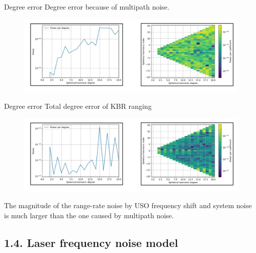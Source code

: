 \documentclass[12pt,english,ignorenonframetext,]{beamer}
\begin{document}
\begin{frame}{Degree error}
	Degree error because of multipath noise.
	\begin{figure}
		\includegraphics{..//images//kbr_multipath.jpg}
	\end{figure}
\end{frame}

\begin{frame}{Degree error}
	Total degree error of KBR ranging
	
	\begin{figure}
		\includegraphics{..//images//kbr.jpg}
	\end{figure}

	The magnitude of the range-rate noise by USO frequency shift and system noise is much larger than the one caused by multipath noise.
\end{frame}

\subsection{\hfill{}1.4. Laser frequency noise model \hfill{}}
\end{document}
